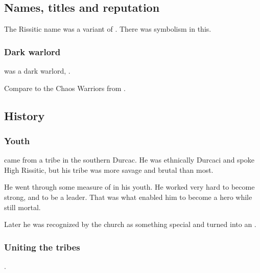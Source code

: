 \subsection{Names, titles and reputation}
The Rissitic name \quo{{\Narkiza}} was a variant of . 
There was symbolism in this. 





\subsubsection{Dark warlord}
\Narkiza was a dark warlord, . 

Compare to the Chaos Warriors from \cite{RPG:Warhammer}. 









\subsection{History}





\subsubsection{Youth}
\Narkiza came from a tribe in the southern Durcac.
He was ethnically Durcaci and spoke High Rissitic, but his tribe was more savage and brutal than most. 

He went through some measure of  in his youth.
He worked very hard to become strong, and to be a leader.
That was what enabled him to become a hero while still mortal.

Later he was recognized by the church as something special and turned into an \Ashenoch.





\subsubsection{Uniting the tribes}
\Narkiza {}. 





